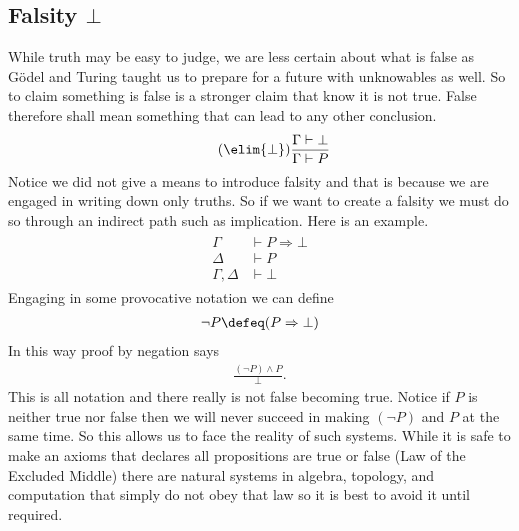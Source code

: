 \subsection{Falsity $\bot$}
While truth may be easy to judge, we are less certain about what is false as 
G\"odel and Turing taught us to prepare for a future with unknowables as well.
So to claim something is false is a stronger claim that know it is not true.
False therefore shall mean something that can lead to any other conclusion.
\begin{align}
    \tag{$\elim{\bot}$}
    \frac{\Gamma\vdash \bot}{\Gamma\vdash P}
\end{align}
Notice we did not give a means to introduce falsity and that is because we 
are engaged in writing down only truths.  So if we want to create a falsity 
we must do so through an indirect path such as implication.  Here is an example.
\begin{align}
    \tag{Proof by negation}
    \begin{array}{rl}
    \Gamma & \vdash P\Rightarrow \bot \\
    \Delta & \vdash P \\
    \hline 
    \Gamma,\Delta & \vdash \bot
    \end{array}
\end{align}
Engaging in some provocative notation we can define 
\begin{align*}
    \neg P \defeq (P\Rightarrow \bot)
\end{align*}
In this way proof by negation says 
\begin{align*}
    \frac{(\neg P)\wedge P}{\bot}.
\end{align*}
This is all notation and there really is not false becoming true.  Notice 
if $P$ is neither true nor false then we will never succeed in making 
$(\neg P)$ and $P$ at the same time.  So this allows us to face the reality 
of such systems.  While it is safe to make an axioms that declares all 
propositions are true or false (Law of the Excluded Middle) there are natural 
systems in algebra, topology, and computation that simply do not obey that law 
so it is best to avoid it until required.